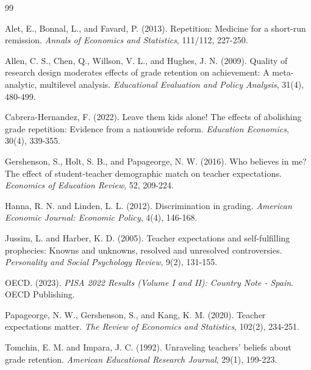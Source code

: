 \documentclass[12pt,a4paper]{article}
\begin{document}
\begin{thebibliography}{99}

Alet, E., Bonnal, L., and Favard, P. (2013).
Repetition: Medicine for a short-run remission.
\emph{Annals of Economics and Statistics}, 111/112, 227-250.

Allen, C. S., Chen, Q., Willson, V. L., and Hughes, J. N. (2009).
Quality of research design moderates effects of grade retention on achievement: A meta-analytic, multilevel analysis.
\emph{Educational Evaluation and Policy Analysis}, 31(4), 480-499.

Cabrera-Hernandez, F. (2022).
Leave them kids alone! The effects of abolishing grade repetition: Evidence from a nationwide reform.
\emph{Education Economics}, 30(4), 339-355.

Gershenson, S., Holt, S. B., and Papageorge, N. W. (2016).
Who believes in me? The effect of student-teacher demographic match on teacher expectations.
\emph{Economics of Education Review}, 52, 209-224.

Hanna, R. N. and Linden, L. L. (2012).
Discrimination in grading.
\emph{American Economic Journal: Economic Policy}, 4(4), 146-168.

Jussim, L. and Harber, K. D. (2005).
Teacher expectations and self-fulfilling prophecies: Knowns and unknowns, resolved and unresolved controversies.
\emph{Personality and Social Psychology Review}, 9(2), 131-155.

OECD. (2023).
\emph{PISA 2022 Results (Volume I and II): Country Note - Spain}.
OECD Publishing.

Papageorge, N. W., Gershenson, S., and Kang, K. M. (2020).
Teacher expectations matter.
\emph{The Review of Economics and Statistics}, 102(2), 234-251.

Tomchin, E. M. and Impara, J. C. (1992).
Unraveling teachers' beliefs about grade retention.
\emph{American Educational Research Journal}, 29(1), 199-223.

\end{thebibliography}
\end{document}
